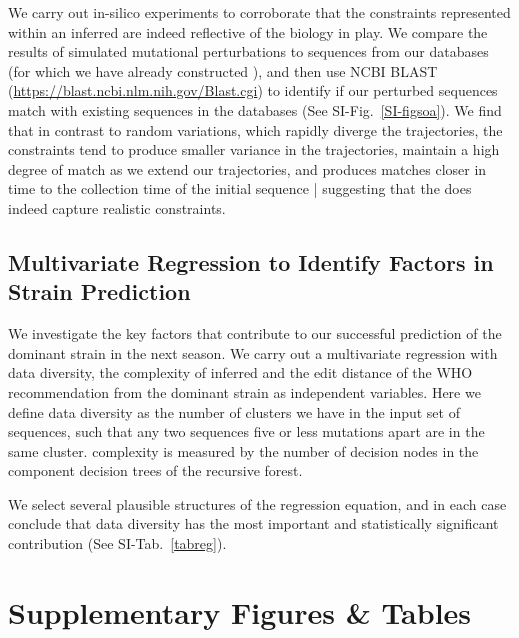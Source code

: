 \documentclass[onecolumn, compsoc,10pt]{IEEEtran}
\begin{document}
We carry out in-silico experiments to corroborate that the constraints represented within an inferred \qnet are indeed reflective of the  biology in play. We compare the results of simulated mutational perturbations to sequences from our databases (for which we have already constructed ), and then use NCBI BLAST (\href{https://blast.ncbi.nlm.nih.gov/Blast.cgi}{https://blast.ncbi.nlm.nih.gov/Blast.cgi}) to identify  if  our perturbed sequences match with existing sequences in the databases (See  SI-Fig.~\ref{SI-figsoa}). We find that in contrast to random variations, which rapidly diverge the trajectories, the \qnet constraints tend to produce smaller variance in the trajectories, maintain a high degree of match as we extend our trajectories, and produces matches closer in time to the collection time of the  initial sequence | suggesting that the \qnet  does indeed capture realistic constraints.









\subsection*{Multivariate Regression to Identify Factors in Strain Prediction}

We investigate the key factors that contribute to our successful prediction of the dominant strain in the next season. We carry out a multivariate regression with data diversity, the complexity of inferred \qnet and the edit distance of the WHO recommendation from the dominant strain as independent variables. Here we define data diversity as the number of clusters we have in the input set of sequences, such that any two sequences five or less mutations apart are in the same cluster. \qnet complexity is measured by the number of decision nodes in the component decision trees of the recursive forest.

We select several plausible structures of the regression equation, and in each case conclude that  data diversity has the most important and statistically significant contribution (See SI-Tab.~\ref{tabreg}).




\clearpage





\section*{Supplementary Figures \& Tables}


\end{document}
